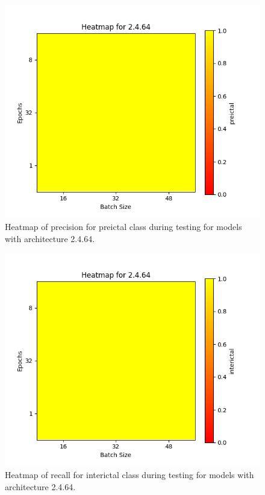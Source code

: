 \documentclass[12pt]{article}
\begin{document}
\begin{figure}[H]
\includegraphics[width=\textwidth]{heatmap_precision_preictal_2.4.64}
\centering
\caption{Heatmap of precision for preictal class during testing for models with architecture 2.4.64.}
\label{fig:time-metrics}
\end{figure}

\begin{figure}[H]
\includegraphics[width=\textwidth]{heatmap_precision_interictal_2.4.64}
\centering
\caption{Heatmap of recall for interictal class during testing for models with architecture 2.4.64.}
\label{fig:time-metrics}
\end{figure}
\end{document}
